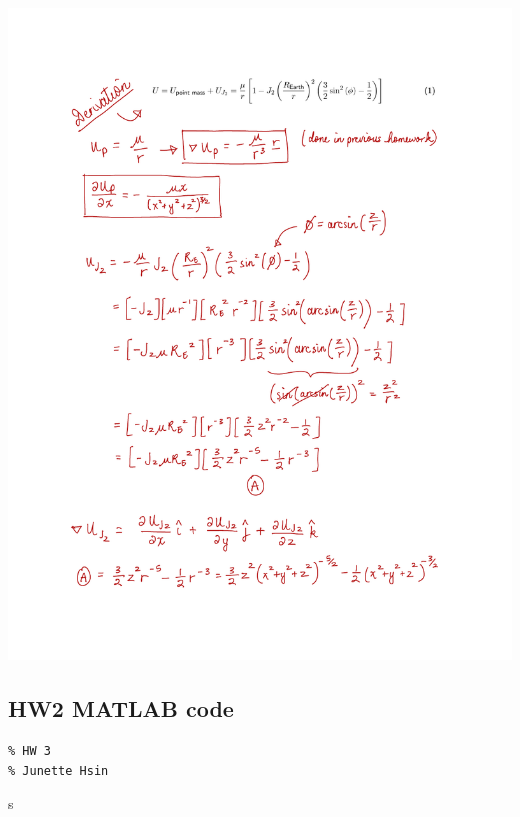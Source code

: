 \documentclass[conf]{new-aiaa}
\begin{document}
\includegraphics[page=3, width=\textwidth]{dUdx_derivation.pdf}

\newpage
\subsection*{HW2 MATLAB code} 

\begin{lstlisting}[basicstyle=\footnotesize]
% ASE 389 Orbit Determination
% HW 3
% Junette Hsin 

\end{lstlisting}


s
\end{document}
